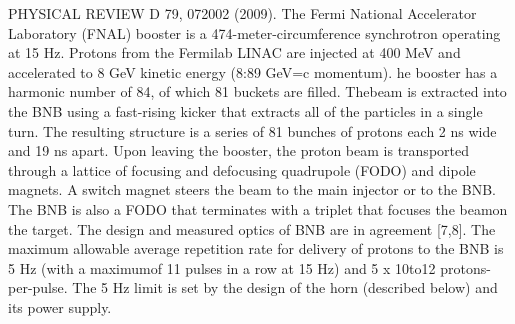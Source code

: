 PHYSICAL REVIEW D 79, 072002 (2009).
The Fermi National Accelerator Laboratory (FNAL) booster is a 474-meter-circumference %
synchrotron operating at 15 Hz. 
Protons from the Fermilab LINAC are injected at 400 MeV and accelerated to 8 GeV kinetic %
energy (8:89 GeV=c momentum).
he booster has a harmonic number of 84, of which 81 buckets are filled. 
Thebeam is extracted into the BNB using a fast-rising kicker that extracts all of the particles %
in a single turn.
The resulting structure is a series of 81 bunches of protons each 2 ns wide and 19 ns apart.
Upon leaving the booster, the proton beam is transported through a lattice of focusing %
and defocusing quadrupole (FODO) and dipole magnets.
A switch magnet steers the beam to the main injector or to the BNB. 
The BNB is also a FODO that terminates with a triplet that focuses the beamon the target. 
The design and measured optics of BNB are in agreement [7,8].
The maximum allowable average repetition rate for delivery of protons to the BNB is %
5 Hz (with a maximumof 11 pulses in a row at 15 Hz) and 5 x 10to12 protons-per-pulse. 
The 5 Hz limit is set by the design of the horn (described below) and its power supply.


